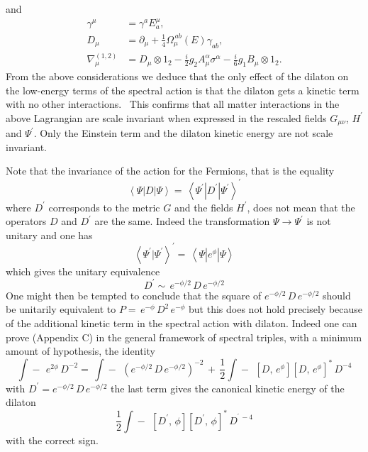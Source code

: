 \documentclass[12pt]{article}%
\begin{document}
and
\begin{align*}
\gamma^{\mu}  &  =\gamma^{a}E_{a}^{\mu},\\
D_{\mu}  &  =\partial_{\mu}+\frac{1}{4}\Omega_{\mu}^{\,ab}\left(  E\right)
\gamma_{ab},\\
\nabla_{\mu}^{\left(  1,2\right)  }  &  =D_{\mu}\otimes1_{2}-\frac{i}{2}%
g_{2}A_{\mu}^{\alpha}\sigma^{\alpha}-\frac{i}{6}g_{1}B_{\mu}\otimes1_{2}.
\end{align*}
From the above considerations we deduce that the only effect of the dilaton on
the low-energy terms of the spectral action is that the dilaton gets a kinetic
term with no other interactions. \ This confirms that all matter interactions
in the above Lagrangian are scale invariant when expressed in the rescaled
fields $G_{\mu\nu}$, $H^{\prime}$ and $\Psi^{\prime}$. Only the Einstein term
and the dilaton kinetic energy are not scale invariant.

Note that the invariance of the action for the Fermions, that is the equality
\begin{equation}
\left\langle \Psi\left\vert D\right\vert \Psi\right\rangle =\,\left\langle
\Psi^{\prime}\left\vert D^{\prime}\right\vert \Psi^{\prime}\right\rangle
^{\prime}%
\end{equation}
where $D^{\prime}$ corresponds to the metric $G$ and the fields $H^{\prime}$,
does not mean that the operators $D$ and $D^{\prime}$ are the same. Indeed the
transformation $\Psi\rightarrow\Psi^{\prime}$ is not unitary and one has
\begin{equation}
\left\langle \Psi^{\prime}|\Psi^{\prime}\right\rangle ^{\prime}=\,\left\langle
\Psi\left\vert e^{\phi}\right\vert \Psi\right\rangle
\end{equation}
which gives the unitary equivalence
\begin{equation}
D^{\prime}\sim\,e^{-\phi/2}\,D\,e^{-\phi/2}%
\end{equation}
One might then be tempted to conclude that the square of $e^{-\phi
/2}\,D\,e^{-\phi/2}$ should be unitarily equivalent to $P=\,e^{-\phi}%
\,D^{2}\,e^{-\phi}$ but this does not hold precisely because of the additional
kinetic term in the spectral action with dilaton. Indeed one can prove
(Appendix C) in the general framework of spectral triples, with a minimum
amount of hypothesis, the identity
\begin{equation}
\label{kin}\int\!\!\!\!\!\!-\ \,e^{2\phi}\,D^{-2}=\,\int
\!\!\!\!\!\!-\ \,(e^{-\phi/2}\,D\,e^{-\phi/2})^{-2}\,+\,\frac{1}{2}%
\int\!\!\!\!\!\!-\ \,[D,\,e^{\phi}][D,\,e^{\phi}]^{\ast}\,D^{-4}%
\end{equation}
with $D^{\prime}=e^{-\phi/2}\,D\,e^{-\phi/2}$ the last term gives the
canonical kinetic energy of the dilaton
\[
\frac{1}{2}\int\!\!\!\!\!\!-\ \,[D^{\prime},\,\phi][D^{\prime},\,\phi]^{\ast
}\,D^{^{\prime}\,-4}
\]
with the correct sign.
\end{document}
